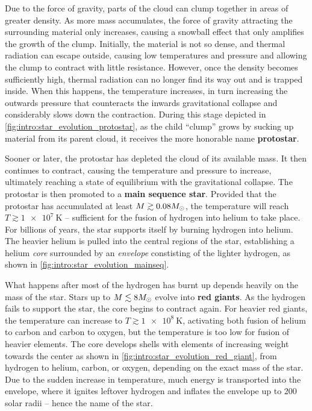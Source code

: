 Due to the force of gravity, parts of the cloud can clump together in areas of greater density.
As more mass accumulates, the force of gravity attracting the surrounding material only increases, causing a snowball effect that only amplifies the growth of the clump.
Initially, the material is not so dense, and thermal radiation can escape outside, causing low temperatures and pressure and allowing the clump to contract with little resistance.
However, once the density becomes sufficiently high, thermal radiation can no longer find its way out and is trapped inside.
When this happens, the temperature increases, in turn increasing the outwards pressure that counteracts the inwards gravitational collapse and considerably slows down the contraction.
During this stage depicted in \cref{fig:intro:star_evolution_protostar}, as the child ``clump'' grows by sucking up material from its parent cloud, it receives the more honorable name \textbf{protostar}.

Sooner or later, the protostar has depleted the cloud of its available mass.
It then continues to contract, causing the temperature and pressure to increase, ultimately reaching a state of equilibrium with the gravitational collapse.
The protostar is then promoted to a \textbf{main sequence star}.
Provided that the protostar has accumulated at least $M \gtrsim 0.08 M_\odot$, the temperature will reach $T \gtrsim \SI{1e7}{\kelvin}$ -- sufficient for the fusion of hydrogen into helium to take place.
For billions of years, the star supports itself by burning hydrogen into helium.
The heavier helium is pulled into the central regions of the star, establishing a helium \emph{core} surrounded by an \emph{envelope} constisting of the lighter hydrogen, as shown in \cref{fig:intro:star_evolution_mainseq}.

What happens after most of the hydrogen has burnt up depends heavily on the mass of the star.
Stars up to $M \lesssim 8 M_\odot$ evolve into \textbf{red giants}.
As the hydrogen fails to support the star, the core begins to contract again.
For heavier red giants, the temperature can increase to $T \gtrsim \SI{1e8}{\kelvin}$, activating both fusion of helium to carbon and carbon to oxygen, but the temperature is too low for fusion of heavier elements.
The core develops shells with elements of increasing weight towards the center as shown in \cref{fig:intro:star_evolution_red_giant}, from hydrogen to helium, carbon, or oxygen, depending on the exact mass of the star.
Due to the sudden increase in temperature, much energy is transported into the envelope, where it ignites leftover hydrogen and inflates the envelope up to 200 solar radii -- hence the name of the star.

